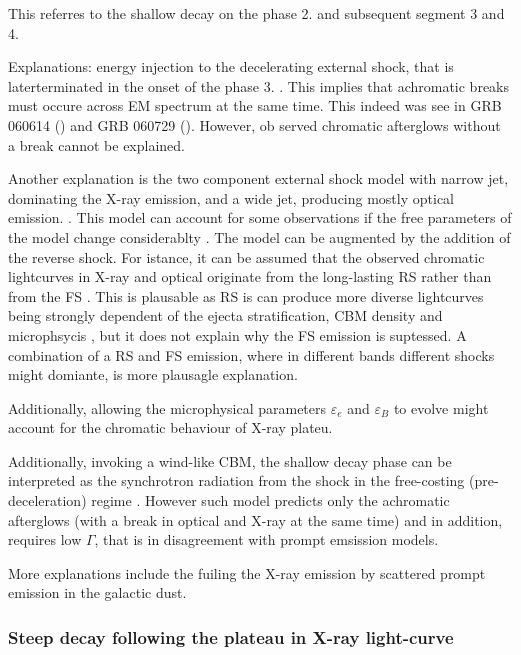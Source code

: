 This referres to the shallow decay on the phase 2. and subsequent segment 3 and 4. 

Explanations: energy injection to the decelerating external shock, that is laterterminated in the onset of the phase 3. \cite{Zhang et al., 2006; Granot et al., 2006; Fan and Piran, 2006b; Nousek et al., 2006; Panaitescu et al., 2006b}. This implies that achromatic breaks must occure across EM spectrum at the same time. This indeed was see in GRB 060614 (\cite{Mangano et al., 2007}) and GRB 060729 (\cite{Grupe et al., 2007}). However, ob served chromatic afterglows without a break cannot be explained.

Another explanation is the two component external shock model with narrow jet, dominating the X-ray emission, and a wide jet, producing mostly optical emission. \cite{e.g. Racusin et al., 2008}. This model can account for some observations if the free parameters of the model change considerablty \cite{de Pasquale et al., 2009).}. The model can be augmented by the addition of the reverse shock. For istance, it can be assumed that the observed chromatic lightcurves in X-ray and optical originate from the long-lasting RS rather than from the FS \cite{Uhm and Beloborodov (2007) and Genet et al. (2007)}. This is plausable as RS is can produce more diverse lightcurves being strongly dependent of the ejecta stratification, CBM density and microphsycis \cite{Uhm et al., 2012; Uhm and Zhang, 2014a}, but it does not explain why the FS emission is suptessed. A combination of a RS and FS emission, where in different bands different shocks might domiante, is more plausagle explanation. 

Additionally, allowing the microphysical parameters $\varepsilon_e$ and $\varepsilon_B$ to evolve might account for the chromatic behaviour of X-ray plateu. \cite{(Ioka et al., 2006; Panaitescu, 2006)}

Additionally, invoking a wind-like CBM, the shallow decay phase can be interpreted as the synchrotron radiation from the shock in the free-costing (pre-deceleration) regime \cite{Shen and Matzner (2012)}. However such model predicts only the achromatic afterglows (with a break in optical and X-ray at the same time) and in addition, requires low $\Gamma$, that is in disagreement with prompt emsission models.

More explanations include the fuiling the X-ray emission by scattered prompt emission in the galactic dust.


\subsubsection{Steep decay following the plateau in X-ray light-curve}

